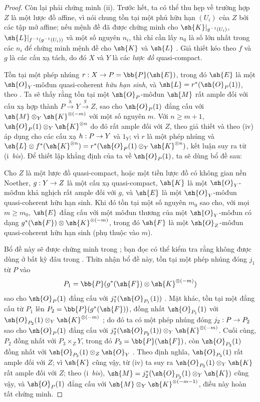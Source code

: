 \documentclass[oneside,10pt]{amsart}
\makeatletter
\renewcommand{\geq}{\geqslant}
\newcommand{\ega@arrow}[2]{\mathchoice{#1}{#2}{#2}{#2}}
\renewcommand{\to}{\ega@arrow{\longrightarrow}{\rightarrow}}
\newcommand{\oldpage}[2][]{\marginnote{\normalfont\footnotesize\textbf{#1}~|~#2}\ignorespaces}
\let\EGAOriginalLabel\label
\renewcommand{\label}[1]{\phantomsection\EGAOriginalLabel{#1}}
\makeatother
\begin{document}
\begin{proof}
Còn lại phải chứng minh (ii).
Trước hết, ta có thể thu hẹp về trường hợp $Z$ là một lược đồ affine, vì nói chung tồn tại một phủ hữu hạn $(U_i)$ của $Z$ bởi các tập mở affine;
nếu mệnh đề đã được chứng minh cho $\sh{K}|_{g^{-1}(U_i)}$, $\sh{L}|_{f^{-1}(g^{-1}(U_i))}$ và một số nguyên $n_i$, thì chỉ cần lấy $n_0$ là số lớn nhất trong các $n_i$ để chứng minh mệnh đề cho $\sh{K}$ và $\sh{L}$ .
Giả thiết kéo theo $f$ và $g$ là các cấu xạ tách, do đó $X$ và $Y$ là các \emph{lược đồ} quasi-compact.

Tồn tại một phép nhúng $r:X\to P=\bb{P}(\sh{E})$, trong đó $\sh{E}$ là một $\sh{O}_Y$-môđun quasi-coherent \emph{hữu hạn sinh}, và $\sh{L}=r^*(\sh{O}_P(1))$, theo .
Ta sẽ thấy rằng tồn tại một $\sh{O}_P$-môđun $\sh{M}$ rất ample đối với cấu xạ hợp thành $P\xrightarrow{h}Y\xrightarrow{g}Z$, sao cho $\sh{O}_P(1)$ đẳng cấu với $\sh{M}\otimes_Y\sh{K}^{\otimes(-m)}$ với một số nguyên $m$.
Với $n\geq m+1$, $\sh{O}_P(1)\otimes_Y\sh{K}^{\otimes n}$ do đó rất ample đối với $Z$, theo giả thiết và theo (iv) áp dụng cho các cấu xạ $h:P\to Y$ và $1_Y$;
vì $r$ là một phép nhúng và $\sh{L}\otimes f^*(\sh{K}^{\otimes n})=r^*(\sh{O}_P(1)\otimes_Y\sh{K}^{\otimes n})$, kết luận suy ra từ (i~\emph{bis}).
Để thiết lập khẳng định của ta về $\sh{O}_P(1)$, ta sẽ dùng bổ đề sau:

\begin{lemma}[4.4.10.1]
\label{II.4.4.10.1}
Cho $Z$ là một lược đồ quasi-compact, hoặc một tiền lược đồ có không gian nền Noether, $g:Y\to Z$ là một cấu xạ quasi-compact, $\sh{K}$ là một $\sh{O}_Y$-môđun khả nghịch rất ample đối với $g$, và $\sh{E}$ là một $\sh{O}_Y$-môđun quasi-coherent hữu hạn sinh.
Khi đó tồn tại một số nguyên $m_0$ sao cho, với mọi $m\geq m_0$, $\sh{E}$ đẳng cấu với một môđun thương của một $\sh{O}_Y$-môđun có dạng $g^*(\sh{F})\otimes\sh{K}^{\otimes(-m)}$, trong đó $\sh{F}$ là một $\sh{O}_Z$-môđun quasi-coherent hữu hạn sinh (phụ thuộc vào $m$).
\end{lemma}

Bổ đề này sẽ được chứng minh trong ;
bạn đọc có thể kiểm tra rằng  không được dùng ở bất kỳ đâu trong .
\oldpage[II]{83}
Thừa nhận bổ đề này, tồn tại một phép nhúng đóng $j_1$ từ $P$ vào
\[
  P_1=\bb{P}(g^*(\sh{F})\otimes\sh{K}^{\otimes(-m)})
\]
sao cho $\sh{O}_P(1)$ đẳng cấu với $j_1^*(\sh{O}_{P_1}(1))$ .
Mặt khác, tồn tại một đẳng cấu từ $P_1$ lên $P_2=\bb{P}(g^*(\sh{F}))$, đồng nhất $\sh{O}_{P_1}(1)$ với $\sh{O}_{P_2}(1)\otimes_Y\sh{K}^{\otimes(-m)}$ ;
do đó ta có một phép nhúng đóng $j_2:P\to P_2$ sao cho $\sh{O}_P(1)$ đẳng cấu với $j_2^*(\sh{O}_{P_2}(1))\otimes_Y\sh{K}^{\otimes(-m)}$.
Cuối cùng, $P_2$ đồng nhất với $P_3\times_Z Y$, trong đó $P_3=\bb{P}(\sh{F})$, còn $\sh{O}_{P_2}(1)$ đồng nhất với $\sh{O}_{P_3}(1)\otimes_Z\sh{O}_Y$ .
Theo định nghĩa, $\sh{O}_{P_3}(1)$ rất ample đối với $Z$;
vì $\sh{K}$ cũng vậy, từ (iv) ta suy ra $\sh{O}_{P_2}(1)\otimes_Y\sh{K}$ rất ample đối với $Z$;
theo (i~\emph{bis}), $\sh{M}=j_2^*(\sh{O}_{P_2}(1)\otimes_Y\sh{K})$ cũng vậy, và $\sh{O}_P(1)$ đẳng cấu với $\sh{M}\otimes_Y\sh{K}^{\otimes(-m-1)}$, điều này hoàn tất chứng minh.
\end{proof}
\end{document}
